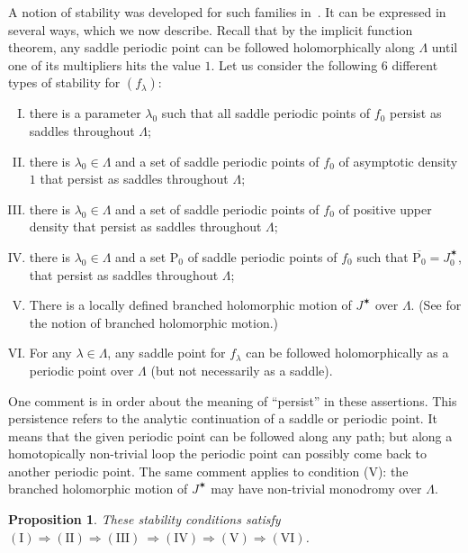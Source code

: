 \documentclass[oneside, 12pt]{amsart}
\newcommand{\lo}{{\lambda_0}}
\newcommand{\jstar}{J^\varstar}
\theoremstyle{plain}
\newtheorem{pro}[thm]{Proposition}
\theoremstyle{definition}
\numberwithin{equation}{section}       %
\numberwithin{equation}{section}       %
\begin{document}
A notion of stability was developed for such families in~\cite{tangencies}. 
It can be expressed in several ways, which we now describe.
Recall that by the implicit function theorem,  any saddle periodic point  
can be followed holomorphically along $\Lambda$  until one of its multipliers hits the value $1$. 
 Let us consider the following 6 different types of stability for $(f_\lambda)$:
 \begin{enumerate}[(I)]
 \item there is a parameter $\lo$ such that 
 all saddle periodic points of $f_0$  persist as saddles  throughout $\Lambda$;
 \item  there  is $\lo\in \Lambda$ and a set 
 of saddle periodic points of $f_0$ of asymptotic density $1$ that persist 
 as saddles throughout $\Lambda$;
 \item  there  is $\lo\in \Lambda$ and a set 
 of saddle periodic points of  $f_0$ of positive  upper density 
  that persist as saddles throughout $\Lambda$;
 \item there  is $\lo\in \Lambda$ and a set $\mathrm P_0$
 of saddle periodic points of 
  $f_0$   such that $\overline{\mathrm P_0} = \jstar_0$, that  persist as saddles
  throughout $\Lambda$;
\item There is a locally defined branched holomorphic motion  of $\jstar$ over $\Lambda$. (See \cite{tangencies} for the notion of branched holomorphic motion.)
\item For any $\lambda\in \Lambda$, any saddle point for $f_\lambda$ can be followed holomorphically as a periodic point over $\Lambda$ (but not necessarily as a saddle). 
 \end{enumerate} 
 

One comment is in order about the meaning of ``persist'' in these assertions. This persistence refers to 
the analytic continuation of a saddle or periodic point. It means that the given periodic point can be followed
along any path; but along a homotopically non-trivial loop the periodic point can possibly come back to another periodic point. 
The same comment applies to  condition (V): the branched holomorphic motion of $\jstar$ may have non-trivial monodromy over $\Lambda$.

\begin{pro}\label{pro:stability_conditions}
These stability conditions satisfy $\mathrm{(I)}\Rightarrow \mathrm{(II)} 
\Rightarrow \mathrm{(III)}\ \Rightarrow \mathrm{(IV)}\Rightarrow \mathrm{(V)}\Rightarrow \mathrm{(VI)}$.
\end{pro}
\end{document}
